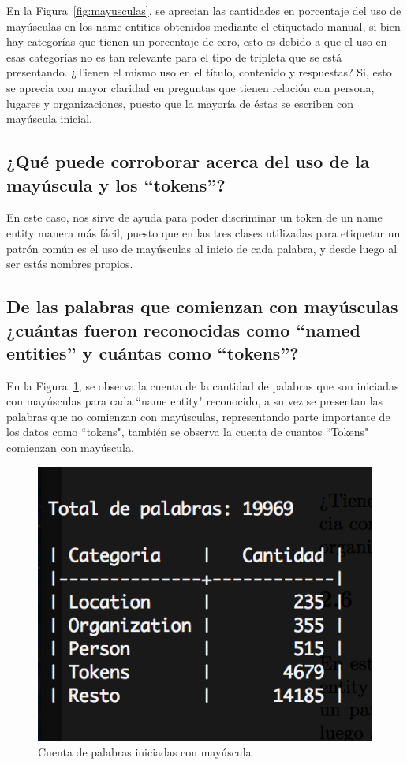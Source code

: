 \documentclass{article}
\begin{document}
En la Figura~\ref{fig:mayusculas}, se aprecian las cantidades en porcentaje del uso de mayúsculas en los name entities obtenidos mediante el etiquetado manual, si bien hay categorías que tienen un porcentaje de cero, esto es debido a que el uso en esas categorías no es tan relevante para el tipo de tripleta que se está presentando. ¿Tienen el mismo uso en el título, contenido y respuestas? Si, esto se aprecia con mayor claridad en preguntas que tienen relación con persona, lugares y organizaciones, puesto que la mayoría de éstas se escriben con mayúscula inicial.

\subsection{¿Qué puede corroborar acerca del uso de la mayúscula y los ``tokens''?}
En este caso, nos sirve de ayuda para poder discriminar un token de un name entity manera más fácil, puesto que en las tres clases utilizadas para etiquetar un patrón común es el uso de mayúsculas al inicio de cada palabra, y desde luego al ser estás nombres propios.

\subsection{De las palabras que comienzan con mayúsculas ¿cuántas fueron reconocidas como ``named entities'' y cuántas como ``tokens''?}
En la Figura~\ref{fig:cuenta}, se observa la cuenta de la cantidad de palabras que son iniciadas con mayúsculas para cada ``name entity" reconocido, a su vez se presentan las palabras que no comienzan con mayúsculas, representando parte importante de los datos como ``tokens", también se observa la cuenta de cuantos ``Tokens" comienzan con mayúscula.
\begin{figure}[h!]
\centering
\includegraphics[scale=0.5]{figuras/mayus_word_token.png}
\caption{Cuenta de palabras iniciadas con mayúscula}
\label{fig:cuenta}
\end{figure}
\end{document}
